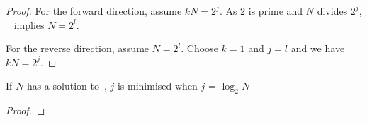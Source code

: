 \documentclass{article}
\begin{document}
\begin{proof}
For the forward direction, assume $kN=2^j$. As $2$ is prime and $N$ divides $2^j$, ~ implies $N=2^l$.

For the reverse direction, assume $N=2^l$. Choose $k=1$ and $j=l$ and we have $kN=2^j$.
\end{proof}

\begin{corollary}
If $N$ has a solution to~, $j$ is minimised when $j$ = $\log_2 N$
\end{corollary}

\begin{proof}
\end{proof}
\end{document}

